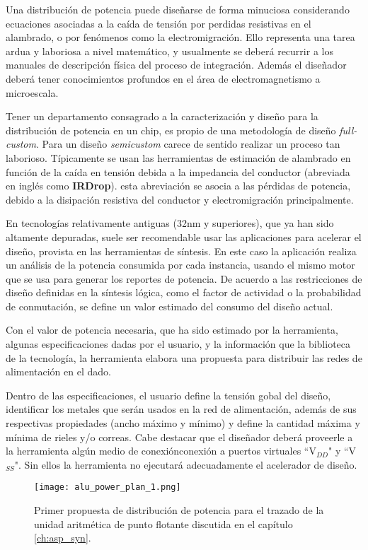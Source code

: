 Una distribución de potencia puede diseñarse de forma minuciosa considerando ecuaciones asociadas a la caída de tensión por perdidas resistivas en el alambrado, o por fenómenos como la electromigración. Ello representa una tarea ardua y laboriosa a nivel matemático, y usualmente se deberá recurrir a los manuales de descripción física del proceso de integración. Además el diseñador deberá tener conocimientos profundos en el área de electromagnetismo a microescala.

Tener un departamento consagrado a la caracterización y diseño para la distribución de potencia en un chip, es propio de una metodología de diseño \textit{full-custom}. Para un diseño \textit{semi\-custom} carece de sentido realizar un proceso tan laborioso. Típicamente se usan las herramientas de estimación de alambrado en función de la caída en tensión debida a la impedancia del conductor (abreviada en inglés como \textbf{IRDrop}). esta abreviación se asocia a las pérdidas de potencia, debido a la disipación resistiva del conductor y electromigración principalmente.

En tecnologías relativamente antiguas (32nm y superiores), que ya han sido altamente depuradas, suele ser recomendable usar las aplicaciones para acelerar el diseño, provista en las herramientas de síntesis. En este caso la aplicación realiza un análisis de la potencia consumida por cada instancia, usando el mismo motor que se usa para generar los reportes de potencia. De acuerdo a las restricciones de diseño definidas en la síntesis lógica, como el factor de actividad o la probabilidad de conmutación, se define un valor estimado del consumo del diseño actual.

Con el valor de potencia necesaria, que ha sido estimado por la herramienta, algunas especificaciones dadas por el usuario, y la información que la biblioteca de la tecnología, la herramienta elabora una propuesta para distribuir las redes de alimentación en el dado.

Dentro de las especificaciones, el usuario define la tensión gobal del diseño, identificar los metales que serán usados en la red de alimentación, además de sus respectivas propiedades (ancho máximo y mínimo) y define la cantidad máxima y mínima de rieles y/o correas. Cabe destacar que el diseñador deberá proveerle a la herramienta algún medio de conexiónconexión a puertos virtuales ``V$_{DD}$" y ``V$_{SS}$". Sin ellos la herramienta no ejecutará adecuadamente el acelerador de diseño.

\begin{figure}
	\texttt{[image: alu\_power\_plan\_1.png]}
	\centering
	\caption{Primer propuesta de distribución de potencia para el trazado de la unidad aritmética de punto flotante discutida en el capítulo \ref{ch:asp_syn}.}
	\label{fig:fpu_pw_plan_1}
\end{figure}

